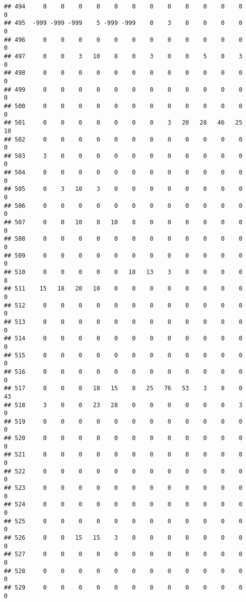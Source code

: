 \documentclass[]{article}
\begin{document}
\begin{verbatim}
## 494     0    0    0    0    0    0    0    0    0    0    0    0    0
## 495  -999 -999 -999    5 -999 -999    0    3    0    0    0    0    0
## 496     0    0    0    0    0    0    0    0    0    0    0    0    0
## 497     0    0    3   10    8    0    3    0    0    5    0    3    0
## 498     0    0    0    0    0    0    0    0    0    0    0    0    0
## 499     0    0    0    0    0    0    0    0    0    0    0    0    0
## 500     0    0    0    0    0    0    0    0    0    0    0    0    0
## 501     0    0    0    0    0    0    0    3   20   28   46   25   10
## 502     0    0    0    0    0    0    0    0    0    0    0    0    0
## 503     3    0    0    0    0    0    0    0    0    0    0    0    0
## 504     0    0    0    0    0    0    0    0    0    0    0    0    0
## 505     0    3   10    3    0    0    0    0    0    0    0    0    0
## 506     0    0    0    0    0    0    0    0    0    0    0    0    0
## 507     0    0   10    8   10    8    0    0    0    0    0    0    0
## 508     0    0    0    0    0    0    0    0    0    0    0    0    0
## 509     0    0    0    0    0    0    0    0    0    0    0    0    0
## 510     0    0    0    0    0   18   13    3    0    0    0    0    8
## 511    15   18   20   10    0    0    0    0    0    0    0    0    0
## 512     0    0    0    0    0    0    0    0    0    0    0    0    0
## 513     0    0    0    0    0    0    0    0    0    0    0    0    0
## 514     0    0    0    0    0    0    0    0    0    0    0    0    0
## 515     0    0    0    0    0    0    0    0    0    0    0    0    0
## 516     0    0    0    0    0    0    0    0    0    0    0    0    0
## 517     0    0    8   18   15    8   25   76   53    3    8    0   43
## 518     3    0    0   23   28    0    0    0    0    0    0    3    0
## 519     0    0    0    0    0    0    0    0    0    0    0    0    0
## 520     0    0    0    0    0    0    0    0    0    0    0    0    0
## 521     0    0    0    0    0    0    0    0    0    0    0    0    0
## 522     0    0    0    0    0    0    0    0    0    0    0    0    0
## 523     0    0    0    0    0    0    0    0    0    0    0    0    0
## 524     0    0    0    0    0    0    0    0    0    0    0    0    0
## 525     0    0    0    0    0    0    0    0    0    0    0    0    0
## 526     0    0   15   15    3    0    0    0    0    0    0    0    0
## 527     0    0    0    0    0    0    0    0    0    0    0    0    0
## 528     0    0    0    0    0    0    0    0    0    0    0    0    0
## 529     0    0    0    0    0    0    0    0    0    0    0    0    0

\end{verbatim}
\end{document}
